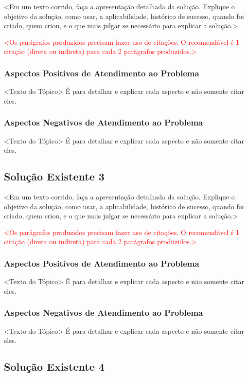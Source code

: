 <Em um texto corrido, faça a apresentação detalhada da solução. Explique o objetivo da solução, como usar, a aplicabilidade, histórico de sucesso, quando foi criado, quem criou, e o que mais julgar se necessário para explicar a solução.>

\textcolor{red}{
<Os parágrafos produzidos precisam fazer uso de citações.
O recomendável é 1 citação (direta ou indireta)
para cada 2 parágrafos produzidos.>
}

\subsubsection{Aspectos Positivos de Atendimento ao Problema}
<Texto do Tópico> É para detalhar e explicar cada aspecto e não somente citar eles.

\subsubsection{Aspectos Negativos de Atendimento ao Problema}
<Texto do Tópico> É para detalhar e explicar cada aspecto e não somente citar eles.

\subsection{Solução Existente 3}

<Em um texto corrido, faça a apresentação detalhada da solução. Explique o objetivo da solução, como usar, a aplicabilidade, histórico de sucesso, quando foi criado, quem criou, e o que mais julgar se necessário para explicar a solução.>

\textcolor{red}{
<Os parágrafos produzidos precisam fazer uso de citações.
O recomendável é 1 citação (direta ou indireta)
para cada 2 parágrafos produzidos.>
}

\subsubsection{Aspectos Positivos de Atendimento ao Problema}
<Texto do Tópico> É para detalhar e explicar cada aspecto e não somente citar eles.

\subsubsection{Aspectos Negativos de Atendimento ao Problema}
<Texto do Tópico> É para detalhar e explicar cada aspecto e não somente citar eles.

\subsection{Solução Existente 4}

